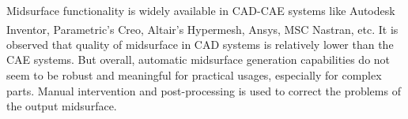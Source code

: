 Midsurface functionality is widely available in CAD-CAE systems like Autodesk Inventor\textsuperscript{\textregistered}, Parametric's Creo,  Altair's Hypermesh\textsuperscript{\textregistered}, Ansys\textsuperscript{\textregistered}, MSC Nastran\textsuperscript{\textregistered}, etc. It is observed that quality of midsurface in CAD systems is relatively lower than the CAE systems. But overall, automatic midsurface generation capabilities do not seem to be robust and meaningful for practical usages, especially for complex parts. Manual intervention and post-processing is used to correct the problems of the output midsurface.



\def \myfigcommcolumnwidth{0.85}

